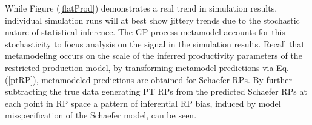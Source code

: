 
%
While Figure (\ref{flatProd}) demonstrates a real trend in simulation results,
individual simulation runs will at best show jittery trends due to the stochastic
nature of statistical inference. The GP process metamodel accounts for this
stochasticity %
to focus analysis on the signal in the simulation results. Recall that metamodeling
occurs on the scale of the inferred productivity parameters of the restricted
production model,
by transforming metamodel predictions via Eq. (\ref{ptRP}), metamodeled predictions
are obtained for Schaefer RPs. By further subtracting the true data generating
PT RPs from the predicted Schaefer RPs at each point in RP space a pattern of
inferential RP bias, induced by model misspecification of the Schaefer model,
can be seen. %

%

